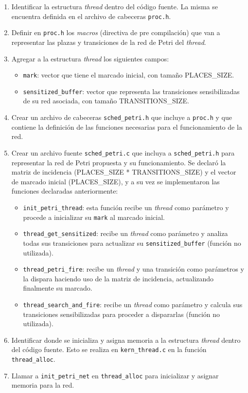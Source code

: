 \documentclass[a4paper]{book}
\begin{document}
\begin{enumerate}
\item Identificar la estructura \emph{thread} dentro del c\'odigo fuente. La misma se encuentra definida en el archivo de cabeceras \verb|proc.h|.
\item Definir en \verb|proc.h| los \emph{macros} (directiva de pre compilaci\'on) que van a representar las plazas y transiciones de la red de Petri del \emph{thread}.
\item Agregar a la estructura \emph{thread} los siguientes campos:
\begin{itemize}
\item \verb|mark|: vector que tiene el marcado inicial, con tama\~no PLACES\_SIZE.
\item \verb|sensitized_buffer|: vector que representa las transiciones sensibilizadas de su red asociada, con tama\~no TRANSITIONS\_SIZE.
\end{itemize}
\item Crear un archivo de cabeceras \verb|sched_petri.h| que incluye a \verb|proc.h| y que contiene la definici\'on de las funciones necesarias para el funcionamiento de la red.
\item Crear un archivo fuente \verb|sched_petri.c| que incluya a \verb|sched_petri.h| para representar la red de Petri propuesta y su funcionamiento. Se declar\'o la matriz de incidencia (PLACES\_SIZE * TRANSITIONS\_SIZE) y el vector de marcado inicial (PLACES\_SIZE), y a su vez se implementaron las funciones declaradas anteriormente:
\begin{itemize}
\item \verb|init_petri_thread|: esta funci\'on recibe un \emph{thread} como par\'ametro y procede a inicializar su \verb|mark| al marcado inicial.
\item \verb|thread_get_sensitized|: recibe un \emph{thread} como par\'ametro y analiza todas sus transiciones para actualizar su \verb|sensitized_buffer| (funci\'on no utilizada).
\item \verb|thread_petri_fire|: recibe un \emph{thread} y una transici\'on como par\'ametros y la dispara haciendo uso de la matriz de incidencia, actualizando finalmente su marcado.
\item \verb|thread_search_and_fire|: recibe un \emph{thread} como par\'ametro y calcula sus transiciones sensibilizadas para proceder a dispararlas (funci\'on no utilizada).
\end{itemize}
\item Identificar donde se inicializa y asigna memoria a la estructura \emph{thread} dentro del c\'odigo fuente. Esto se realiza en \verb|kern_thread.c| en la funci\'on \verb|thread_alloc|.
\item Llamar a \verb|init_petri_net| en \verb|thread_alloc| para inicializar y asignar memoria para la red.
\end{enumerate}
\end{document}
